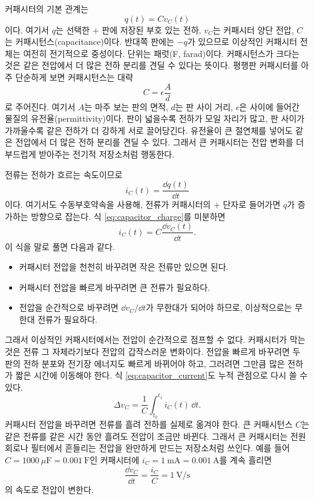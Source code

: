 커패시터의 기본 관계는
\begin{equation}
  q(t)=C v_C(t)
  \label{eq:capacitor_charge}
\end{equation}
이다.
여기서 $q$는 선택한 $+$ 판에 저장된 부호 있는 전하, $v_C$는 커패시터 양단 전압, $C$는 커패시턴스(capacitance)이다.
반대쪽 판에는 $-q$가 있으므로 이상적인 커패시터 전체는 여전히 전기적으로 중성이다.
단위는 패럿(F, farad)이다.
커패시턴스가 크다는 것은 같은 전압에서 더 많은 전하 분리를 견딜 수 있다는 뜻이다.
평행판 커패시터를 아주 단순하게 보면 커패시턴스는 대략
\begin{equation}
  C = \epsilon \frac{A}{d}
\end{equation}
로 주어진다.
여기서 $A$는 마주 보는 판의 면적, $d$는 판 사이 거리, $\epsilon$은 사이에 들어간 물질의 유전율(permittivity)이다.
판이 넓을수록 전하가 모일 자리가 많고, 판 사이가 가까울수록 같은 전하가 더 강하게 서로 끌어당긴다.
유전율이 큰 절연체를 넣어도 같은 전압에서 더 많은 전하 분리를 견딜 수 있다.
그래서 큰 커패시터는 전압 변화를 더 부드럽게 받아주는 전기적 저장소처럼 행동한다.

전류는 전하가 흐르는 속도이므로
\begin{equation}
  i_C(t)=\frac{\dd q(t)}{\dd t}
\end{equation}
이다.
여기서도 수동부호약속을 사용해, 전류가 커패시터의 $+$ 단자로 들어가면 $q$가 증가하는 방향으로 잡는다.
식 \eqref{eq:capacitor_charge}를 미분하면
\begin{equation}
  i_C(t)=C\frac{\dd v_C(t)}{\dd t}.
  \label{eq:capacitor_current}
\end{equation}
이 식을 말로 풀면 다음과 같다.

\begin{itemize}
  \item 커패시터 전압을 천천히 바꾸려면 작은 전류만 있으면 된다.
  \item 커패시터 전압을 빠르게 바꾸려면 큰 전류가 필요하다.
  \item 전압을 순간적으로 바꾸려면 $\dd v_C/\dd t$가 무한대가 되어야 하므로, 이상적으로는 무한대 전류가 필요하다.
\end{itemize}

그래서 이상적인 커패시터에서는 전압이 순간적으로 점프할 수 없다.
커패시터가 막는 것은 전류 그 자체라기보다 전압의 갑작스러운 변화이다.
전압을 빠르게 바꾸려면 두 판의 전하 분포와 전기장 에너지도 빠르게 바뀌어야 하고, 그러려면 그만큼 많은 전하가 짧은 시간에 이동해야 한다.
식 \eqref{eq:capacitor_current}도 누적 관점으로 다시 쓸 수 있다.
\begin{equation}
  \Delta v_C
  =
  \frac{1}{C}\int_{t_0}^{t_1} i_C(t)\,\dd t.
\end{equation}
커패시터 전압을 바꾸려면 전류를 흘려 전하를 실제로 옮겨야 한다.
큰 커패시턴스 $C$는 같은 전류를 같은 시간 동안 흘려도 전압이 조금만 바뀐다.
그래서 큰 커패시터는 전원 회로나 필터에서 흔들리는 전압을 완만하게 만드는 저장소처럼 쓰인다.
예를 들어 $C=1000~\mu\mathrm{F}=0.001~\mathrm{F}$인 커패시터에 $i_C=1~\mathrm{mA}=0.001~\mathrm{A}$를 계속 흘리면
\begin{equation}
  \frac{\dd v_C}{\dd t}=\frac{i_C}{C}=1~\mathrm{V/s}
\end{equation}
의 속도로 전압이 변한다.

